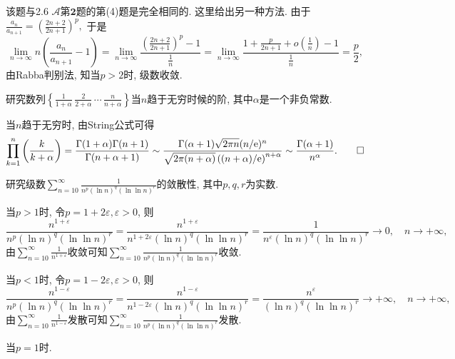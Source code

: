 \begin{quiza}
\begin{solution}
该题与2.6 \(\boldsymbol{\mathcal{A}}\)第\(\boldsymbol{2}\)题的第(4)题是完全相同的. 这里给出另一种方法. 由于\(\frac{a_n}{a_{n+1}}=\left(\frac{2n+2}{2n+1}\right)^p,\) 于是\[\lim_{n\rightarrow\infty}n\left(\frac{a_n}{a_{n+1}}-1\right)=\lim_{n\rightarrow\infty}\frac{\left(\displaystyle\frac{2n+2}{2n+1}\right)^p-1}{\displaystyle\frac{1}{n}}=\lim_{n\rightarrow\infty}\frac{1+\displaystyle\frac{p}{2n+1}+o\left(\frac{1}{n}\right)-1}{\displaystyle\frac{1}{n}}=\frac{p}{2},\]由Rabba判别法, 知当\(p>2\)时, 级数收敛.
\end{solution}
\woe 研究数列\(\left\lbrace\frac{1}{1+\alpha}\,\frac{2}{2+\alpha}\,\cdots\,\frac{n}{n+\alpha}\right\rbrace \)当\(n\)趋于无穷时候的阶, 其中\(\alpha\)是一个非负常数.
\begin{solution}
当\(n\)趋于无穷时, 由String公式可得\[\prod_{k=1}^{n}\left(\frac{k}{k+\alpha}\right)=\frac{\Gamma(1+\alpha)\Gamma(n+1)}{\Gamma(n+\alpha+1)}\sim\frac{\Gamma(\alpha+1)\sqrt{2\pi n}(n/\mathrm{e})^n}{\sqrt{2\pi(n+\alpha)}\left((n+\alpha)/\mathrm{e}\right)^{n+\alpha}}\sim\frac{\Gamma(\alpha+1)}{n^\alpha}.\qedhere\]
\end{solution}
\woe 研究级数\(\sum_{n=10}^{\infty}\frac{1}{n^p(\ln n)^q(\ln\ln n)^r}\)的敛散性, 其中\(p,q,r\)为实数.
\begin{solution}
当\(p>1\)时, 令\(p=1+2\varepsilon,\varepsilon>0\), 则\[\frac{n^{1+\varepsilon}}{n^p(\ln n)^q(\ln\ln n)^r}=\frac{n^{1+\varepsilon}}{n^{1+2\varepsilon}(\ln n)^q(\ln\ln n)^r}=\frac{1}{n^\varepsilon(\ln n)^q(\ln\ln n)^r}\rightarrow 0,\quad n\rightarrow+\infty,\]由\(\sum_{n=10}^{\infty}\frac{1}{n^{1+\varepsilon}}\)收敛可知\(\sum_{n=10}^{\infty}\frac{1}{n^p(\ln n)^q(\ln\ln n)^r}\)收敛.

当\(p<1\)时, 令\(p=1-2\varepsilon,\varepsilon>0\), 则\[\frac{n^{1-\varepsilon}}{n^p(\ln n)^q(\ln\ln n)^r}=\frac{n^{1-\varepsilon}}{n^{1-2\varepsilon}(\ln n)^q(\ln\ln n)^r}=\frac{n^{\varepsilon}}{(\ln n)^q(\ln\ln n)^r}\rightarrow+\infty,\quad n\rightarrow+\infty,\]由\(\sum_{n=10}^{\infty}\frac{1}{n^{1-\varepsilon}}\)发散可知\(\sum_{n=10}^{\infty}\frac{1}{n^p(\ln n)^q(\ln\ln n)^r}\)发散.

当\(p=1\)时.
\end{solution}
\end{quiza}
